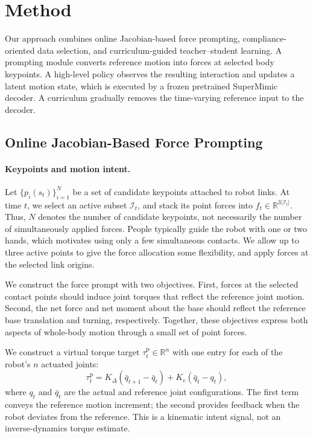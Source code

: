 \section{Method}
\label{sec:method}

Our approach combines online Jacobian-based force prompting, compliance-oriented data selection, and curriculum-guided teacher--student learning. A prompting module converts reference motion into forces at selected body keypoints. A high-level policy observes the resulting interaction and updates a latent motion state, which is executed by a frozen pretrained SuperMimic decoder. A curriculum gradually removes the time-varying reference input to the decoder.

\subsection{Online Jacobian-Based Force Prompting}
\label{sec:jacobian_prompt}

\paragraph{Keypoints and motion intent.}
Let $\{p_i(s_t)\}_{i=1}^{N}$ be a set of candidate keypoints attached to robot links. At time $t$, we select an active subset $\mathcal{I}_t$, and stack its point forces into $f_t\in\mathbb{R}^{3|\mathcal{I}_t|}$. Thus, $N$ denotes the number of candidate keypoints, not necessarily the number of simultaneously applied forces. People typically guide the robot with one or two hands, which motivates using only a few simultaneous contacts. We allow up to three active points to give the force allocation some flexibility, and apply forces at the selected link origins.

We construct the force prompt with two objectives. First, forces at the selected contact points should induce joint torques that reflect the reference joint motion. Second, the net force and net moment about the base should reflect the reference base translation and turning, respectively. Together, these objectives express both aspects of whole-body motion through a small set of point forces.

We construct a virtual torque target $\tau_t^{\mathrm{p}}\in\mathbb{R}^n$ with one entry for each of the robot's $n$ actuated joints:
\begin{equation}
    \tau_t^{\mathrm{p}}
    = K_{\Delta}(\bar{q}_{t+1}-\bar{q}_t)
    + K_e(\bar{q}_t-q_t),
    \label{eq:virtual_torque}
\end{equation}
where $q_t$ and $\bar{q}_t$ are the actual and reference joint configurations. The first term conveys the reference motion increment; the second provides feedback when the robot deviates from the reference. This is a kinematic intent signal, not an inverse-dynamics torque estimate.

